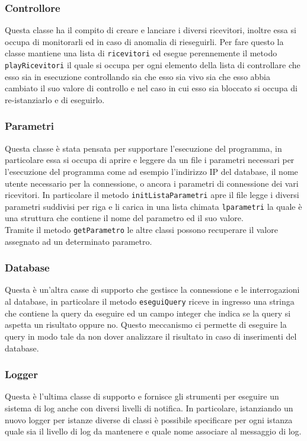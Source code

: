 \subsubsection{Controllore}
Questa classe ha il compito di creare e lanciare i diversi ricevitori, inoltre essa si occupa di monitorarli ed in caso di anomalia di rieseguirli. Per fare questo la classe mantiene una lista di \texttt{ricevitori} ed esegue perennemente il metodo \texttt{playRicevitori} il quale si occupa per ogni elemento della lista di controllare che esso sia in esecuzione controllando sia che esso sia vivo sia che esso abbia cambiato il suo valore di controllo e nel caso in cui esso sia bloccato si occupa di re-istanziarlo e di eseguirlo.
\subsubsection{Parametri}
Questa classe è stata pensata per supportare l'esecuzione del programma, in particolare essa si occupa di aprire e leggere da un file i parametri necessari per l'esecuzione del programma come ad esempio l'indirizzo IP del database, il nome utente necessario per la connessione, o ancora i parametri di connessione dei vari ricevitori. In particolare il metodo \texttt{initListaParametri} apre il file legge i diversi parametri suddivisi per riga e li carica in una lista chimata \texttt{lparametri} la quale è una struttura che contiene il nome del parametro ed il suo valore.\\
Tramite il metodo \texttt{getParametro} le altre classi possono recuperare il valore assegnato ad un determinato parametro.
\subsubsection{Database}
Questa è un'altra casse di supporto che gestisce la connessione e le interrogazioni al database, in particolare il metodo \texttt{eseguiQuery} riceve in ingresso una stringa che contiene la query da eseguire ed un campo integer che indica se la query si aspetta un risultato oppure no. Questo meccanismo ci permette di eseguire la query in modo tale da non dover analizzare il risultato in caso di inserimenti del database.
\subsubsection{Logger}
Questa è l'ultima classe di supporto e fornisce gli strumenti per eseguire un sistema di log anche con diversi livelli di notifica. In particolare, istanziando un nuovo logger per istanze diverse di classi è possibile specificare per ogni istanza quale sia il livello di log da mantenere e quale nome associare al messaggio di log.

